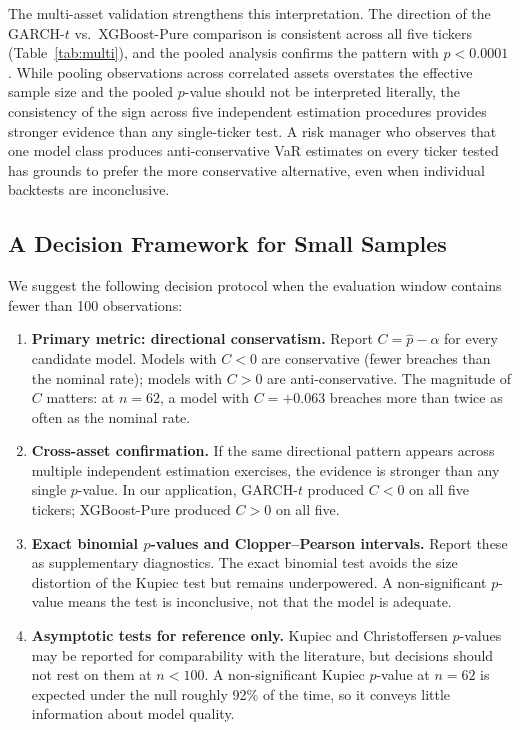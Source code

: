 \documentclass[12pt,a4paper]{article}
\begin{document}
The multi-asset validation strengthens this interpretation. The direction of the GARCH-$t$ vs.\ XGBoost-Pure comparison is consistent across all five tickers (Table~\ref{tab:multi}), and the pooled analysis confirms the pattern with $p < 0.0001$. While pooling observations across correlated assets overstates the effective sample size and the pooled $p$-value should not be interpreted literally, the consistency of the sign across five independent estimation procedures provides stronger evidence than any single-ticker test. A risk manager who observes that one model class produces anti-conservative VaR estimates on every ticker tested has grounds to prefer the more conservative alternative, even when individual backtests are inconclusive.

\subsection{A Decision Framework for Small Samples}

We suggest the following decision protocol when the evaluation window contains fewer than 100 observations:

\begin{enumerate}
    \item \textbf{Primary metric: directional conservatism.} Report $C = \hat{p} - \alpha$ for every candidate model. Models with $C < 0$ are conservative (fewer breaches than the nominal rate); models with $C > 0$ are anti-conservative. The magnitude of $C$ matters: at $n = 62$, a model with $C = +0.063$ breaches more than twice as often as the nominal rate.
    \item \textbf{Cross-asset confirmation.} If the same directional pattern appears across multiple independent estimation exercises, the evidence is stronger than any single $p$-value. In our application, GARCH-$t$ produced $C < 0$ on all five tickers; XGBoost-Pure produced $C > 0$ on all five.
    \item \textbf{Exact binomial $p$-values and Clopper--Pearson intervals.} Report these as supplementary diagnostics. The exact binomial test avoids the size distortion of the Kupiec test but remains underpowered. A non-significant $p$-value means the test is inconclusive, not that the model is adequate.
    \item \textbf{Asymptotic tests for reference only.} Kupiec and Christoffersen $p$-values may be reported for comparability with the literature, but decisions should not rest on them at $n < 100$. A non-significant Kupiec $p$-value at $n = 62$ is expected under the null roughly 92\% of the time, so it conveys little information about model quality.
\end{enumerate}
\end{document}
